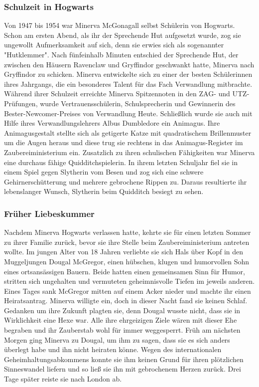 \documentclass[a4paper, 10pt]{article}
\begin{document}
\subsubsection*{\large Schulzeit in Hogwarts}
Von 1947 bis 1954 war Minerva McGonagall selbst Schülerin von Hogwarts. Schon am ersten Abend, als ihr der Sprechende Hut aufgesetzt wurde, zog sie ungewollt Aufmerksamkeit auf sich, denn sie erwies sich als sogenannter "Hutklemmer". Nach fünfeinhalb Minuten entschied der Sprechende Hut, der zwischen den Häusern Ravenclaw und Gryffindor geschwankt hatte, Minerva nach Gryffindor zu schicken.
\vspace{10pt}
\newline
Minerva entwickelte sich zu einer der besten Schülerinnen ihres Jahrgangs, die ein besonderes Talent für das Fach Verwandlung mitbrachte. Während ihrer Schulzeit erreichte Minerva Spitzennoten in den ZAG- und UTZ-Prüfungen, wurde Vertrauensschülerin, Schulsprecherin und Gewinnerin des Bester-Newcomer-Preises von Verwandlung Heute. Schließlich wurde sie auch mit Hilfe ihres Verwandlungslehrers Albus Dumbledore ein Animagus. Ihre Animagusgestalt stellte sich als getigerte Katze mit quadratischem Brillenmuster um die Augen heraus und diese trug sie rechtens in das Animagus-Register im Zaubereiministerium ein.
\vspace{10pt}
\newline
Zusatzlich zu ihren schulischen Fähigkeiten war Minerva eine durchaus fähige Quidditchspielerin. In ihrem letzten Schuljahr fiel sie in einem Spiel gegen Slytherin vom Besen und zog sich eine schwere Gehirnerschütterung und mehrere gebrochene Rippen zu. Daraus resultierte ihr lebenslanger Wunsch, Slytherin beim Quidditch besiegt zu sehen.
\subsubsection*{\large Früher Liebeskummer}
Nachdem Minerva Hogwarts verlassen hatte, kehrte sie für einen letzten Sommer zu ihrer Familie zurück, bevor sie ihre Stelle beim Zaubereiministerium antreten wollte.
\vspace{10pt}
\newline
Im jungen Alter von 18 Jahren verliebte sie sich Hals über Kopf in den Muggeljungen Dougal McGregor, einen hübschen, klugen und humorvollen Sohn eines ortsansässigen Bauern. Beide hatten einen gemeinsamen Sinn für Humor, stritten sich ungehalten und vermuteten geheimnisvolle Tiefen im jeweils anderen. Eines Tages sank McGregor mitten auf einem Acker nieder und machte ihr einen Heiratsantrag. Minerva willigte ein, doch in dieser Nacht fand sie keinen Schlaf. Gedanken um ihre Zukunft plagten sie, denn Dougal wusste nicht, dass sie in Wirklichkeit eine Hexe war. Alle ihre ehrgeizigen Ziele wären mit dieser Ehe begraben und ihr Zauberstab wohl für immer weggesperrt.
\vspace{10pt}
\newline
Früh am nächsten Morgen ging Minerva zu Dougal, um ihm zu sagen, dass sie es sich anders überlegt habe und ihn nicht heiraten könne. Wegen des internationalen Geheimhaltungsabkommens konnte sie ihm keinen Grund für ihren plötzlichen Sinneswandel liefern und so ließ sie ihn mit gebrochenem Herzen zurück. Drei Tage später reiste sie nach London ab.
\end{document}
